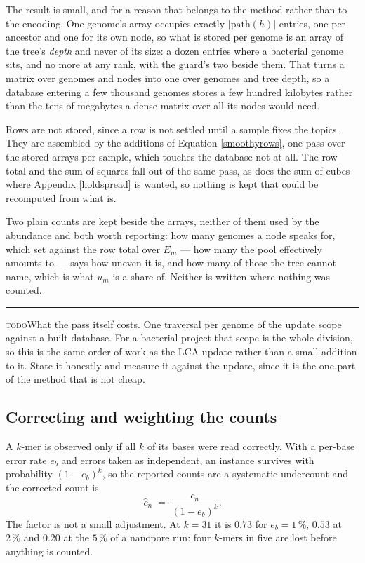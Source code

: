 \documentclass[pdflatex,sn-vancouver-num]{sn-jnl}
\newif\ifshowtodos \showtodostrue
\newcommand{\todo}[1]{%
  \ifshowtodos
    \par\addvspace{0.7\baselineskip}%
    \begin{list}{}{%
      \setlength{\leftmargin}{1.5em}%
      \setlength{\rightmargin}{1.5em}%
      \setlength{\topsep}{0pt}%
      \setlength{\partopsep}{0pt}%
      \setlength{\parsep}{0.5\baselineskip}%
      \setlength{\itemsep}{0pt}%
    }%
    \item[]\footnotesize\color{black!70}%
      \textcolor{orange!65!black}{\rule[-0.2ex]{2pt}{1.15ex}}\hspace{0.55em}%
      \textcolor{orange!65!black}{\textsc{todo}}\hspace{0.6em}\ignorespaces#1%
    \end{list}%
    \addvspace{0.7\baselineskip}%
  \fi%
}
\begin{document}
    The result is small, and for a reason that belongs to the method rather than to the encoding. One
    genome's array occupies exactly $\lvert \mathrm{path}(h) \rvert$ entries, one per ancestor and one
    for its own node, so what is stored per genome is an array of the tree's \emph{depth} and never of
    its size: a dozen entries where a bacterial genome sits, and no more at any rank, with the
    guard's two beside them. That turns a
    matrix over genomes and nodes into one over genomes and tree depth, so a database entering a few
    thousand genomes stores a few hundred kilobytes rather than the tens of megabytes a dense matrix
    over all its nodes would need.

    Rows are not stored, since a row is not settled until a sample fixes the topics. They are
    assembled by the additions of Equation \eqref{smoothyrows}, one pass over the stored arrays per
    sample, which touches the database not at all. The row total and the sum of squares fall out of
    the same pass, as does the sum of cubes where Appendix \ref{holdspread} is wanted, so nothing is
    kept that could be recomputed from what is.

    Two plain counts are kept beside the arrays, neither of them used by the abundance and both worth
    reporting: how many genomes a node speaks for, which set against the row total over $E_m$ ---
    how many the pool effectively amounts to --- says how uneven it is, and how many of those the
    tree cannot name, which is what $u_m$ is a share of. Neither is written where nothing was counted.

    \todo{What the pass itself costs. One traversal per genome of the update scope against a built
    database. For a bacterial project that scope is the whole division, so this is the same order of
    work as the LCA update rather than a small addition to it. State it honestly and measure it
    against the update, since it is the one part of the method that is not cheap.}

    \subsection{Correcting and weighting the counts}\label{error}
    A $k$-mer is observed only if all $k$ of its bases were read correctly. With a per-base error rate
    $e_b$ and errors taken as independent, an instance survives with probability $(1 - e_b)^k$, so the
    reported counts are a systematic undercount and the corrected count is
    \begin{equation}\label{smoothyerror}
        \hat{c}_n \;=\; \frac{c_n}{(1 - e_b)^k}.
    \end{equation}
    The factor is not a small adjustment. At $k = 31$ it is $0.73$ for $e_b = 1\,\%$, $0.53$ at
    $2\,\%$ and $0.20$ at the $5\,\%$ of a nanopore run: four $k$-mers in five are lost before
    anything is counted.
\end{document}
